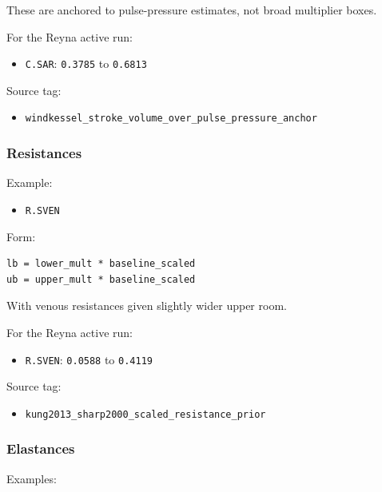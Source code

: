 \documentclass[11pt,a4paper]{article}
\begin{document}
These are anchored to pulse-pressure estimates, not broad multiplier boxes.

For the Reyna active run:

\begin{itemize}[leftmargin=1.5em]
    \item \texttt{C.SAR}: \texttt{0.3785} to \texttt{0.6813}
\end{itemize}

Source tag:

\begin{itemize}[leftmargin=1.5em]
    \item \texttt{windkessel\_stroke\_volume\_over\_pulse\_pressure\_anchor}
\end{itemize}

\subsubsection{Resistances}

Example:

\begin{itemize}[leftmargin=1.5em]
    \item \texttt{R.SVEN}
\end{itemize}

Form:

\begin{verbatim}
lb = lower_mult * baseline_scaled
ub = upper_mult * baseline_scaled
\end{verbatim}

With venous resistances given slightly wider upper room.

For the Reyna active run:

\begin{itemize}[leftmargin=1.5em]
    \item \texttt{R.SVEN}: \texttt{0.0588} to \texttt{0.4119}
\end{itemize}

Source tag:

\begin{itemize}[leftmargin=1.5em]
    \item \texttt{kung2013\_sharp2000\_scaled\_resistance\_prior}
\end{itemize}

\subsubsection{Elastances}

Examples:
\end{document}

